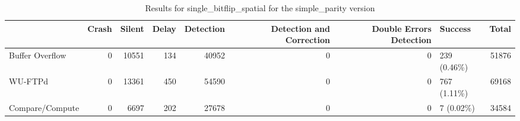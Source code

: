 \begin{table}[t]
	\centering
	\caption{Results for single_bitflip_spatial for the simple_parity version}
	\label{table:end_sim_by_status_simple_parity_1_single_bitflip_spatial}
	\begin{tabular}{lrrrrrrlr}
		\toprule
		                & Crash & Silent & Delay & Detection & Detection and Correction & Double Errors Detection & Success      & Total \\
		\midrule
		Buffer Overflow & 0     & 10551  & 134   & 40952     & 0                        & 0                       & 239 (0.46\%) & 51876 \\
		WU-FTPd         & 0     & 13361  & 450   & 54590     & 0                        & 0                       & 767 (1.11\%) & 69168 \\
		Compare/Compute & 0     & 6697   & 202   & 27678     & 0                        & 0                       & 7 (0.02\%)   & 34584 \\
		\bottomrule
	\end{tabular}
\end{table}
